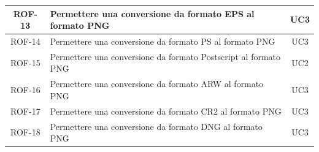 \begin{table}[H]
\begin{tabularx}{\textwidth}{|c|X|c|}
        \\
        \hline
        ROF-13             & Permettere una conversione da formato EPS al formato PNG        & UC3
        \\
        \hline
        ROF-14             & Permettere una conversione da formato PS al formato PNG         & UC3
        \\
        \hline
        ROF-15             & Permettere una conversione da formato Postscript al formato PNG
                           & UC2
        \\
        \hline
        ROF-16             & Permettere una conversione da formato ARW al formato PNG        & UC3
        \\
        \hline
        ROF-17             & Permettere una conversione da formato CR2 al formato PNG        & UC3
        \\
        \hline
        ROF-18             & Permettere una conversione da formato DNG al formato PNG        & UC3
        \\
        \hline
    \end{tabularx}
\end{table}%

